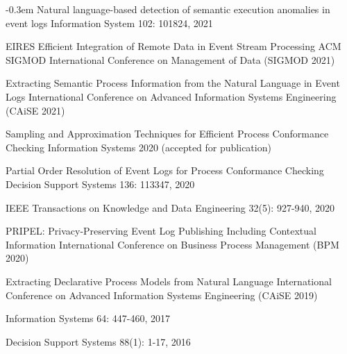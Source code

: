 \begin{enumerate}[label=\arabic*.]
	\itemsep-0.3em
	{Natural language-based detection of semantic execution anomalies in event logs}
	{Information System 102: 101824, 2021}
	
			 {EIRES Efficient Integration of Remote Data in Event Stream Processing}
	{ACM SIGMOD International Conference on Management of Data (SIGMOD 2021)}
	
	 {Extracting Semantic Process Information from the Natural Language in Event Logs} 
	{International Conference on Advanced Information Systems Engineering (CAiSE 2021)}
	
	{Sampling and Approximation Techniques for Efficient Process Conformance Checking}
	{Information Systems 2020 (accepted for publication)}
	
	{Partial Order Resolution of Event Logs for Process Conformance Checking}
	{Decision Support Systems 136: 113347, 2020}



{IEEE Transactions on Knowledge and Data Engineering  32(5): 927-940, 2020}

	 {	PRIPEL: Privacy-Preserving Event Log Publishing Including Contextual Information}
{International Conference on Business Process Management (BPM 2020)}

	 {Extracting Declarative Process Models from Natural Language} 
{International Conference on Advanced Information Systems Engineering (CAiSE 2019)}
	
{Information Systems 64: 447-460, 2017}

{Decision Support Systems 88(1): 1-17, 2016}

\end{enumerate}


